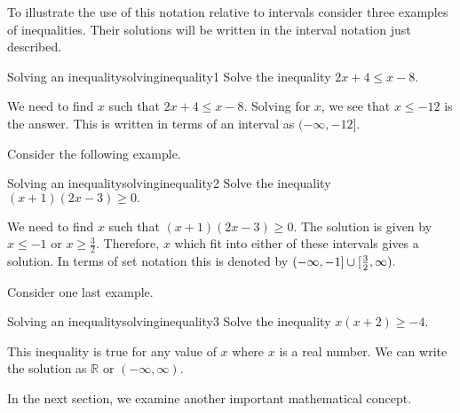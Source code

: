 To illustrate the use of this notation relative to intervals consider three
examples of inequalities. Their solutions will be written in the interval notation
just described.

\begin{example}{Solving an inequality}{solvinginequality1}
Solve the inequality $2x+4\leq x-8$.
\end{example}

\begin{solution}
We need to find $x$ such that $2x+4\leq x-8$. Solving for $x$, we see that 
$x\leq -12$ is the answer. This is written in terms of an interval as $(-\infty ,-12].$
\end{solution}

Consider the following example.

\begin{example}{Solving an inequality}{solvinginequality2}
Solve the inequality $\left( x+1\right) \left( 2x-3\right) \geq0.$
\end{example}

\begin{solution}
We need to find $x$ such that $\left( x+1\right) \left( 2x-3\right) \geq0.$ 
The solution is given by  $x\leq -1$ or $x\geq \frac{3}{2}$. Therefore, 
$x$ which fit into either of these intervals gives a solution. In terms of set notation this is denoted by $(-\infty ,-1]\cup
[ \vspace{0.05in}\frac{3}{2},\infty ).$
\end{solution}

Consider one last example.

\begin{example}{Solving an inequality}{solvinginequality3}
Solve the inequality $x \left( x+2\right) \geq-4$.
\end{example}

\begin{solution}
This inequality is true for any value of $x$ where $x$ is a real number. We can write the solution as $\mathbb{R}$ or $\left(
-\infty ,\infty \right) .$
\end{solution}

In the next section, we examine another important mathematical concept.
